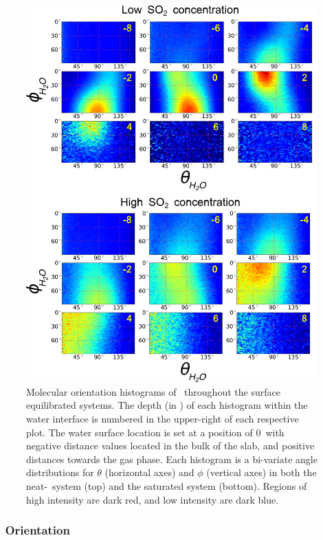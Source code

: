 \begin{figure}[h!]
	\begin{center}
		\includegraphics[scale=1.0]{images/h2o-angles/theta-phi.png}
		\caption{Molecular orientation histograms of \wat~throughout the surface equilibrated systems. The depth (in \angs) of each histogram within the water interface is numbered in the upper-right of each respective plot. The water surface location is set at a position of 0\angs~with negative distance values located in the bulk of the slab, and positive distances towards the gas phase. Each histogram is a bi-variate angle distributions for $\theta$ (horizontal axes) and $\phi$ (vertical axes) in both the neat-\wat~system (top) and the saturated system (bottom). Regions of high intensity are dark red, and low intensity are dark blue.}
		\label{fig:water-orientation}
	\end{center}
\end{figure}


\subsubsection{\suldiox~Orientation}

